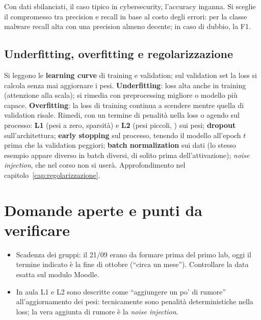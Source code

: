 \begin{esame}
Con dati sbilanciati, il caso tipico in cybersecurity, l'accuracy inganna. Si sceglie il compromesso
tra precision e recall in base al costo degli errori: per la classe malware recall alta con una
precision almeno decente; in caso di dubbio, la F1.
\end{esame}

\subsection{Underfitting, overfitting e regolarizzazione}
Si leggono le \textbf{learning curve} di training e validation; sul validation set la loss si calcola
senza mai aggiornare i pesi. \textbf{Underfitting}: loss alta anche in training (attenzione alla
scala); si rimedia con preprocessing migliore o modello più capace. \textbf{Overfitting}: la loss di
training continua a scendere mentre quella di validation risale. Rimedi, con un termine di penalità
nella loss o agendo sul processo: \textbf{L1} (pesi a zero, sparsità) e \textbf{L2} (pesi piccoli,
) sui pesi; \textbf{dropout} sull'architettura; \textbf{early stopping} sul
processo, tenendo il modello all'epoch $t$ prima che la validation peggiori; \textbf{batch
normalization} sui dati (lo stesso esempio appare diverso in batch diversi, di solito prima
dell'attivazione); \emph{noise injection}, che nel corso non si userà. Approfondimento nel
capitolo~\ref{cap:regolarizzazione}.

\section{Domande aperte e punti da verificare}
\begin{verifica}
\begin{itemize}
  \item Scadenza dei gruppi: il 21/09 erano da formare prima del primo lab, oggi il termine indicato
    è la fine di ottobre (``circa un mese''). Controllare la data esatta sul modulo Moodle.
  \item In aula L1 e L2 sono descritte come ``aggiungere un po' di rumore'' all'aggiornamento dei
    pesi: tecnicamente sono penalità deterministiche nella loss; la vera aggiunta di rumore è la
    \emph{noise injection}.
\end{itemize}
\end{verifica}
